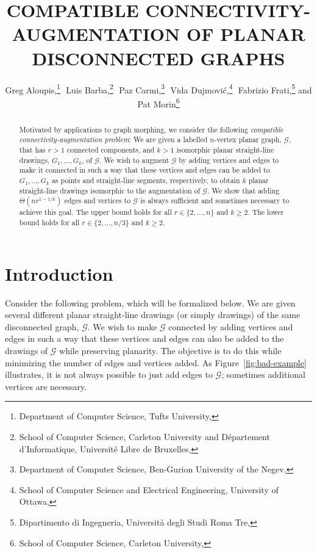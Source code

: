 \documentclass{patmorin}
\title{\MakeUppercase{Compatible Connectivity-Augmentation \newline of Planar Disconnected Graphs}}
\author{Greg Aloupis,\thanks{Department of Computer Science, Tufts University, 
                             \email{aloupis.greg@gmail.com}}\,\,
       Luis Barba,\thanks{School of Computer Science, Carleton University
                          and Département d'Informatique, 
                          Université Libre de Bruxelles,
                          \email{lbarbafl@ulb.ac.be}}\,\,
       Paz Carmi,\thanks{Department of Computer Science,
                         Ben-Gurion University of the Negev,
                         \email{carmip@cs.bgu.ac.il}}\,\,
       Vida Dujmović,\thanks{School of Computer Science 
                             and Electrical Engineering,
                             University of Ottawa,
                             \email{vida.dujmovic@uottawa.ca}}\,\,
       Fabrizio Frati,\thanks{Dipartimento di Ingegneria,
                              Università degli Studi Roma Tre,
                              \email{frati@dia.uniroma3.it}}\newline
       and Pat Morin\thanks{School of Computer Science, Carleton University,
                            \email{morin@scs.carleton.ca}}}
\begin{document}
\begin{titlepage}

\maketitle
\begin{abstract}
Motivated by applications to graph morphing, we consider the following
\emph{compatible connectivity-augmentation problem}: We are given
a labelled $n$-vertex planar graph, $\mathcal{G}$, that has $r>1$
connected components, and $k>1$ isomorphic planar straight-line drawings,
$G_1,\ldots,G_k$, of $\mathcal{G}$. We wish to augment $\mathcal G$
by adding  vertices and edges to make it connected in such a way that
these vertices and edges can be added to $G_1,\ldots,G_k$ as points and
straight-line segments, respectively, to obtain $k$ planar straight-line
drawings isomorphic to the augmentation of $\mathcal G$.  We show
that adding $\Theta(nr^{1-1/k})$ edges and vertices to $\mathcal{G}$
is always sufficient and sometimes necessary to achieve this goal.
The upper bound holds for all $r\in\{2,\ldots,n\}$ and $k\ge 2$. The
lower bound holds for all $r\in\{2,\ldots,n/3\}$ and $k\ge 2$.
\end{abstract}

\end{titlepage}


\section{Introduction}
Consider the following problem, which will be formalized
below.  We are given several different planar straight-line drawings (or simply drawings)
of the same disconnected graph, $\mathcal G$.
We wish to make $\mathcal G$ connected by adding vertices and edges in
such a way that these vertices and edges can also be added to the drawings of $\mathcal G$ while preserving planarity.  The objective is to do this while minimizing the number
of edges and vertices added. As Figure~\ref{fig:bad-example} illustrates, it is not always possible to just add edges to $\mathcal G$; sometimes additional vertices are necessary.
\end{document}
